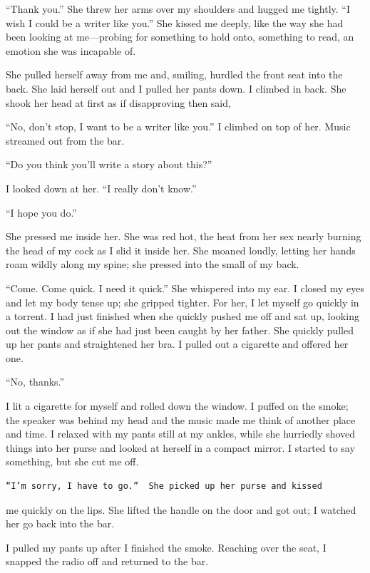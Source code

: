 ``Thank you.'' She threw her arms over my shoulders and hugged me
tightly. ``I wish I could be a writer like you.'' She kissed me deeply,
like the way she had been looking at me---probing for something to hold
onto, something to read, an emotion she was incapable of.

She pulled herself away from me and, smiling, hurdled the front seat
into the back. She laid herself out and I pulled her pants down. I
climbed in back. She shook her head at first as if disapproving then
said,

``No, don't stop, I want to be a writer like you.'' I climbed on top of
her. Music streamed out from the bar.

``Do you think you'll write a story about this?''

I looked down at her. ``I really don't know.''

``I hope you do.''

She pressed me inside her. She was red hot, the heat from her sex nearly
burning the head of my cock as I slid it inside her. She moaned loudly,
letting her hands roam wildly along my spine; she pressed into the small
of my back.

``Come. Come quick. I need it quick.'' She whispered into my ear. I
closed my eyes and let my body tense up; she gripped tighter. For her, I
let myself go quickly in a torrent. I had just finished when she quickly
pushed me off and sat up, looking out the window as if she had just been
caught by her father. She quickly pulled up her pants and straightened
her bra. I pulled out a cigarette and offered her one.

``No, thanks.''

I lit a cigarette for myself and rolled down the window. I puffed on the
smoke; the speaker was behind my head and the music made me think of
another place and time. I relaxed with my pants still at my ankles,
while she hurriedly shoved things into her purse and looked at herself
in a compact mirror. I started to say something, but she cut me off.

\begin{verbatim}
“I’m sorry, I have to go.”  She picked up her purse and kissed
\end{verbatim}

me quickly on the lips. She lifted the handle on the door and got out; I
watched her go back into the bar.

I pulled my pants up after I finished the smoke. Reaching over the seat,
I snapped the radio off and returned to the bar.

